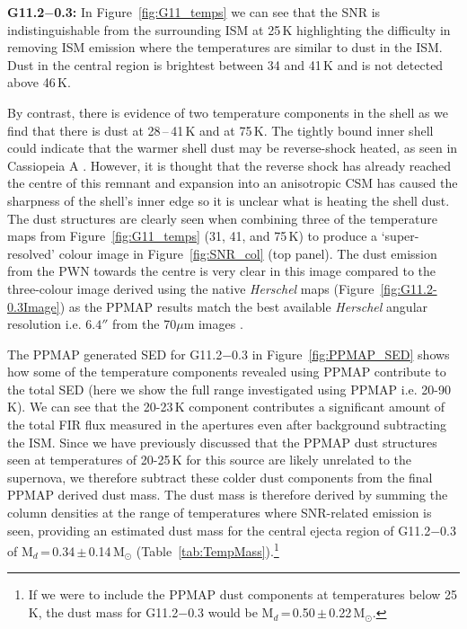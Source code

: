 \documentclass[fleqn,usenatbib]{mnras}
\newcommand\PPMAPMassa{0.34}
\newcommand\PPMAPMassErra{0.14}
\newcommand\PPMAPMassaWide{0.50}
\newcommand\PPMAPMassErraWide{0.22}
\begin{document}
{%


\bigskip

\textbf{G11.2$-$0.3:}
In Figure~\ref{fig:G11_temps} we can see that the SNR is indistinguishable from the surrounding ISM at 25\,K highlighting the difficulty in removing ISM emission where the temperatures are similar to dust in the ISM. Dust in the central region is brightest between 34 and 41\,K and is not detected above 46\,K.%

By contrast, there is evidence of two temperature components in the shell as we find that there is dust at 28\,--\,41\,K and at 75\,K. The tightly bound inner shell could indicate that the warmer shell dust may be reverse-shock heated, as seen in Cassiopeia A \citep{Rho2008}. However, it is thought that the reverse shock has already reached the centre of this remnant and expansion into an anisotropic CSM has caused the sharpness of the shell's inner edge \citep{Borkowski2016} so it is unclear what is heating the shell dust.  The dust structures are clearly seen when combining three of the temperature maps from Figure~\ref{fig:G11_temps} (31, 41, and 75\,K) to produce a `super-resolved' colour image in Figure~\ref{fig:SNR_col} (top panel). The dust emission from the PWN towards the centre is very clear in this image compared to the three-colour image derived using the native \textit{Herschel} maps (Figure~\ref{fig:G11.2-0.3Image}) as the PPMAP results match the best available \textit{Herschel} angular resolution i.e. $6.4''$ from the 70$\mu$m images \citep{Traficante2011}.

{The PPMAP generated SED for G11.2$-$0.3 in Figure~\ref{fig:PPMAP_SED} shows how some of the temperature components revealed using PPMAP contribute to the total SED (here we show the full range investigated using PPMAP i.e. 20-90\,K).  We can see that the 20-23\,K component contributes a significant amount of the total FIR flux measured in the apertures even after background subtracting the ISM. Since we have previously discussed that the PPMAP dust structures seen at temperatures of 20-25\,K for this source are likely unrelated to the supernova, we therefore subtract these colder dust components from the final PPMAP derived dust mass. The dust mass is therefore derived by summing the column densities at the range of temperatures where SNR-related emission is seen, providing an estimated dust mass for the central ejecta region of G11.2$-$0.3 of M$_d$\,=\,\PPMAPMassa\,$\pm$\,\PPMAPMassErra\,M$_\odot$ (Table~\ref{tab:TempMass}).\footnote{If we were to include the PPMAP dust components at temperatures below 25\,K, the dust mass for G11.2$-$0.3 would be M$_d$\,=\,\PPMAPMassaWide\,$\pm$\,\PPMAPMassErraWide\,M$_\odot$.
}

}}
\end{document}
